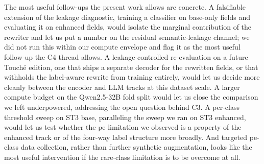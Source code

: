 The most useful follow-ups the present work allows are concrete. A falsifiable extension of the leakage diagnostic, training a classifier on base-only fields and evaluating it on enhanced fields, would isolate the marginal contribution of the rewriter and let us put a number on the residual semantic-leakage channel; we did not run this within our compute envelope and flag it as the most useful follow-up the C4 thread allows. A leakage-controlled re-evaluation on a future Touch\'{e} edition, one that ships a separate decoder for the rewritten fields, or that withholds the label-aware rewrite from training entirely, would let us decide more cleanly between the encoder and LLM tracks at this dataset scale. A larger compute budget on the Qwen2.5-32B fold split would let us close the comparison we left underpowered, addressing the open question behind C3. A per-class threshold sweep on ST3 base, paralleling the sweep we ran on ST3 enhanced, would let us test whether the \textsf{pe} limitation we observed is a property of the enhanced track or of the four-way label structure more broadly. And targeted \textsf{pe}-class data collection, rather than further synthetic augmentation, looks like the most useful intervention if the rare-class limitation is to be overcome at all.
